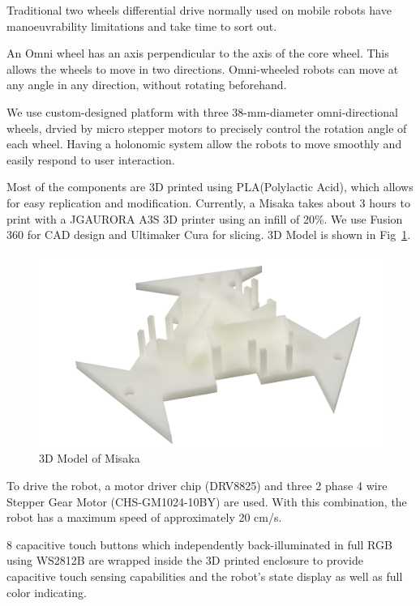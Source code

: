 \documentclass[conference]{IEEEtran}
\begin{document}
Traditional two wheels differential drive normally used on mobile robots have manoeuvrability limitations and take time to sort out\cite{ribeiro2004three}. 

An Omni wheel has an axis perpendicular to the axis of the core wheel. This allows the wheels to move in two directions. Omni-wheeled robots can move at any angle in any direction, without rotating beforehand.

We use custom-designed platform with three 38-mm-diameter omni-directional wheels, drvied by micro stepper motors to precisely control the rotation angle of each wheel. Having a holonomic system allow the robots to move smoothly and easily respond to user interaction.

Most of the components are 3D printed using PLA(Polylactic Acid), which allows for easy replication and modification. Currently, a Misaka takes about 3 hours to print with a JGAURORA A3S 3D printer using an infill of 20\%. We use Fusion 360 for CAD design and Ultimaker Cura for slicing. 3D Model is shown in Fig~\ref{fig:3DModel}.

\begin{figure}[htbp]
    \centering
    \includegraphics[width=\columnwidth]{3DModel.png}
    \caption{3D Model of Misaka}
    \label{fig:3DModel}
\end{figure}

To drive the robot, a motor driver chip (DRV8825) and three 2 phase 4 wire Stepper Gear Motor (CHS-GM1024-10BY) are used. With this combination, the robot has a maximum speed of approximately 20 cm/s.

8 capacitive touch buttons which independently back-illuminated in full RGB using WS2812B are wrapped inside the 3D printed enclosure to provide capacitive touch sensing capabilities and the robot’s state display as well as full color indicating.
\end{document}
